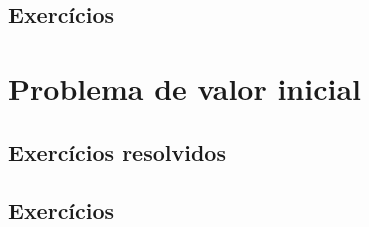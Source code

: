 
\badgeConstrucao

\subsection{Exercícios}


\badgeConstrucao

\section{Problema de valor inicial}\label{cap_apint_sec_pvi}


\badgeConstrucao

\subsection{Exercícios resolvidos}


\badgeConstrucao

\subsection{Exercícios}


\badgeConstrucao
